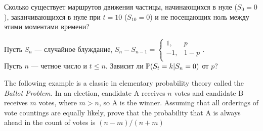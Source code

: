 \begin{problem}
Сколько существует маршрутов движения частицы, начинающихся в нуле
($S_{0}=0$), заканчивающихся в нуле при $t=10$ ($S_{10}=0$) и не
посещающих ноль между этими моментами времени?

\begin{sol}

\end{sol}
\end{problem}

\begin{problem}
Пусть $S_{n}$ — случайное блуждание, $S_{n}-S_{n-1}=
\begin{cases}
  1, & p \\
  -1, & 1-p \\
\end{cases}$. \\
Пусть $n$ — четное число и $t\le n$. Зависит ли
$\P(S_{t}=k|S_{n}=0)$ от $p$?

\begin{sol}

\end{sol}
\end{problem}

\begin{problem}
 The following example is a classic in elementary probability theory called
the \emph{Ballot Problem.}  In an election, candidate A receives $n$
votes and candidate B receives $m$ votes, where $m > n$, so A is the
winner.  Assuming that all orderings of vote countings are equally
likely, prove that the probability that A is always ahead in the count of votes
is $(n-m)/(n+m)$

\begin{sol}

\end{sol}
\end{problem}

